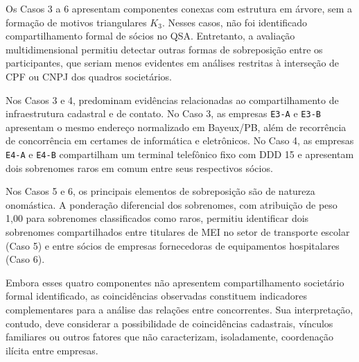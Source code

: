 Os Casos 3 a 6 apresentam componentes conexas com estrutura em árvore, sem a formação de motivos triangulares $K_3$. Nesses casos, não foi identificado compartilhamento formal de sócios no QSA. Entretanto, a avaliação multidimensional permitiu detectar outras formas de
sobreposição entre os participantes, que seriam menos evidentes em análises restritas à interseção de CPF ou CNPJ dos quadros societários.

Nos Casos 3 e 4, predominam evidências relacionadas ao compartilhamento de infraestrutura cadastral e de contato. No Caso 3, as empresas \texttt{E3-A} e \texttt{E3-B} apresentam o mesmo endereço normalizado em Bayeux/PB, além de recorrência de concorrência em certames de informática e eletrônicos. No Caso 4, as empresas \texttt{E4-A} e \texttt{E4-B} compartilham um terminal telefônico fixo com DDD 15 e apresentam dois sobrenomes raros em comum entre seus respectivos sócios. 

Nos Casos 5 e 6, os principais elementos de sobreposição são de natureza onomástica. A ponderação diferencial dos sobrenomes, com atribuição de peso 1{,}00 para sobrenomes classificados como raros, permitiu identificar dois sobrenomes compartilhados entre titulares de MEI no setor de transporte escolar (Caso 5) e entre sócios de empresas fornecedoras de equipamentos hospitalares (Caso 6).

Embora esses quatro componentes não apresentem compartilhamento societário formal identificado, as coincidências observadas constituem indicadores complementares para a análise das relações entre concorrentes. Sua interpretação, contudo, deve considerar a possibilidade de coincidências cadastrais, vínculos familiares ou outros fatores que não caracterizam, isoladamente, coordenação ilícita entre empresas.
